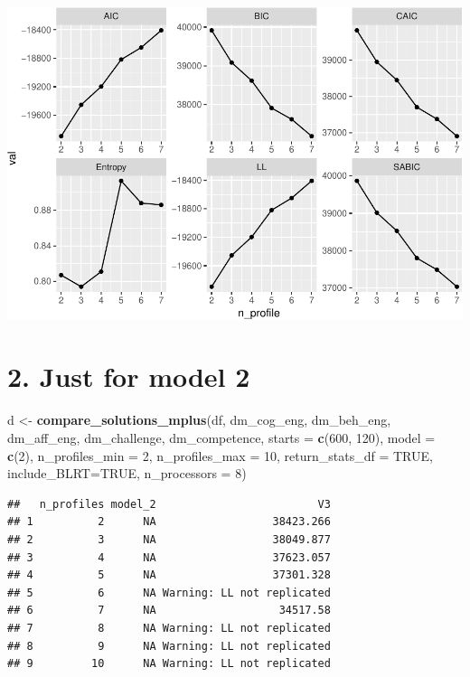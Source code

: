 \documentclass[]{book}
\newenvironment{Shaded}{\begin{snugshade}}{\end{snugshade}}
\newcommand{\KeywordTok}[1]{\textcolor[rgb]{0.13,0.29,0.53}{\textbf{#1}}}
\newcommand{\DataTypeTok}[1]{\textcolor[rgb]{0.13,0.29,0.53}{#1}}
\newcommand{\DecValTok}[1]{\textcolor[rgb]{0.00,0.00,0.81}{#1}}
\newcommand{\StringTok}[1]{\textcolor[rgb]{0.31,0.60,0.02}{#1}}
\newcommand{\OtherTok}[1]{\textcolor[rgb]{0.56,0.35,0.01}{#1}}
\newcommand{\NormalTok}[1]{#1}
\begin{document}
\includegraphics{rosenberg-dissertation_files/figure-latex/compare-solutions-model1-1.pdf}

\section{2. Just for model 2}\label{just-for-model-2}

\begin{Shaded}
\begin{Highlighting}[]
\NormalTok{d <-}\StringTok{ }\KeywordTok{compare_solutions_mplus}\NormalTok{(df,  }
\NormalTok{                             dm_cog_eng, dm_beh_eng, dm_aff_eng, dm_challenge, dm_competence,}
                             \DataTypeTok{starts =} \KeywordTok{c}\NormalTok{(}\DecValTok{600}\NormalTok{, }\DecValTok{120}\NormalTok{),}
                             \DataTypeTok{model =} \KeywordTok{c}\NormalTok{(}\DecValTok{2}\NormalTok{),}
                             \DataTypeTok{n_profiles_min =} \DecValTok{2}\NormalTok{, }
                             \DataTypeTok{n_profiles_max =} \DecValTok{10}\NormalTok{,}
                             \DataTypeTok{return_stats_df =} \OtherTok{TRUE}\NormalTok{,}
                             \DataTypeTok{include_BLRT=}\OtherTok{TRUE}\NormalTok{,}
                             \DataTypeTok{n_processors =} \DecValTok{8}\NormalTok{)}
\end{Highlighting}
\end{Shaded}

\begin{verbatim}
##   n_profiles model_2                         V3
## 1          2      NA                  38423.266
## 2          3      NA                  38049.877
## 3          4      NA                  37623.057
## 4          5      NA                  37301.328
## 5          6      NA Warning: LL not replicated
## 6          7      NA                   34517.58
## 7          8      NA Warning: LL not replicated
## 8          9      NA Warning: LL not replicated
## 9         10      NA Warning: LL not replicated
\end{verbatim}
\end{document}
